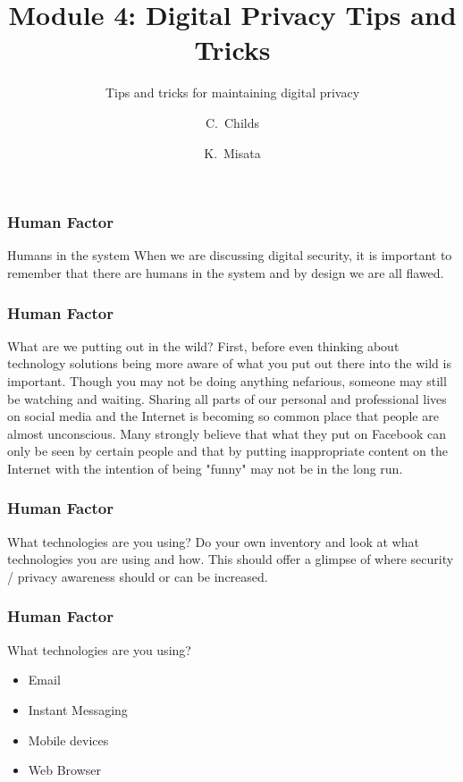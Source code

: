 \documentclass{beamer}
\title[Module 4: Digital Privacy Tips]
{Module 4: Digital Privacy Tips and Tricks}
\subtitle{Tips and tricks for maintaining digital privacy}
\author[C, Childs]
{C.~Childs\inst{1} \and K.~Misata\inst{2}}
\institute[Tor Project]
{
  \inst{1}
  Support coordinator / Translation coordinator\\
  The Tor Project
  \and
  \inst{2}
  Outreach coordinator\\
  The Tor Project
}
\begin{document}
\frame{\titlepage}

\begin{frame}
\frametitle{Human Factor}
	\begin{block}{Humans in the system}
		When we are discussing digital security, it is important to remember that there are humans in the system and by design we are all flawed.
	\end{block}
\end{frame}

\begin{frame}
\frametitle{Human Factor}
        \begin{block}{What are we putting out in the wild?}
        First, before even thinking about technology solutions being more aware of what you put out there into the wild is important.  Though you may not be doing anything nefarious, someone may still be watching and waiting.  Sharing all parts of our personal and professional lives on social media and the Internet is becoming so common place that people are almost unconscious.  Many strongly believe that what they put on Facebook can only be seen by certain people and that by putting inappropriate content on the Internet with the intention of being "funny" may not be in the long run.
	\end{block}
\end{frame}

\begin{frame}
\frametitle{Human Factor}
        \begin{block}{What technologies are you using?}
		Do your own inventory and look at what technologies you are using and how.  This should offer a glimpse of where security / privacy awareness should or can be increased.
        \end{block}
\end{frame}

\begin{frame}
\frametitle{Human Factor}
        \begin{block}{What technologies are you using?}
        	\begin{itemize}
			\item<1-> Email
			\item<2-> Instant Messaging
			\item<3-> Mobile devices
			\item<4-> Web Browser
		\end{itemize}
	\end{block}
\end{frame}
\end{document}
